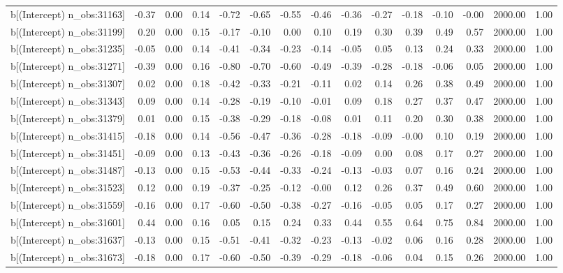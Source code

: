 \begin{table}[ht]
\begin{tabular}{rrrrrrrrrrrrrrr}
  b[(Intercept) n\_obs:31163] & -0.37 & 0.00 & 0.14 & -0.72 & -0.65 & -0.55 & -0.46 & -0.36 & -0.27 & -0.18 & -0.10 & -0.00 & 2000.00 & 1.00 \\ 
  b[(Intercept) n\_obs:31199] & 0.20 & 0.00 & 0.15 & -0.17 & -0.10 & 0.00 & 0.10 & 0.19 & 0.30 & 0.39 & 0.49 & 0.57 & 2000.00 & 1.00 \\ 
  b[(Intercept) n\_obs:31235] & -0.05 & 0.00 & 0.14 & -0.41 & -0.34 & -0.23 & -0.14 & -0.05 & 0.05 & 0.13 & 0.24 & 0.33 & 2000.00 & 1.00 \\ 
  b[(Intercept) n\_obs:31271] & -0.39 & 0.00 & 0.16 & -0.80 & -0.70 & -0.60 & -0.49 & -0.39 & -0.28 & -0.18 & -0.06 & 0.05 & 2000.00 & 1.00 \\ 
  b[(Intercept) n\_obs:31307] & 0.02 & 0.00 & 0.18 & -0.42 & -0.33 & -0.21 & -0.11 & 0.02 & 0.14 & 0.26 & 0.38 & 0.49 & 2000.00 & 1.00 \\ 
  b[(Intercept) n\_obs:31343] & 0.09 & 0.00 & 0.14 & -0.28 & -0.19 & -0.10 & -0.01 & 0.09 & 0.18 & 0.27 & 0.37 & 0.47 & 2000.00 & 1.00 \\ 
  b[(Intercept) n\_obs:31379] & 0.01 & 0.00 & 0.15 & -0.38 & -0.29 & -0.18 & -0.08 & 0.01 & 0.11 & 0.20 & 0.30 & 0.38 & 2000.00 & 1.00 \\ 
  b[(Intercept) n\_obs:31415] & -0.18 & 0.00 & 0.14 & -0.56 & -0.47 & -0.36 & -0.28 & -0.18 & -0.09 & -0.00 & 0.10 & 0.19 & 2000.00 & 1.00 \\ 
  b[(Intercept) n\_obs:31451] & -0.09 & 0.00 & 0.13 & -0.43 & -0.36 & -0.26 & -0.18 & -0.09 & 0.00 & 0.08 & 0.17 & 0.27 & 2000.00 & 1.00 \\ 
  b[(Intercept) n\_obs:31487] & -0.13 & 0.00 & 0.15 & -0.53 & -0.44 & -0.33 & -0.24 & -0.13 & -0.03 & 0.07 & 0.16 & 0.24 & 2000.00 & 1.00 \\ 
  b[(Intercept) n\_obs:31523] & 0.12 & 0.00 & 0.19 & -0.37 & -0.25 & -0.12 & -0.00 & 0.12 & 0.26 & 0.37 & 0.49 & 0.60 & 2000.00 & 1.00 \\ 
  b[(Intercept) n\_obs:31559] & -0.16 & 0.00 & 0.17 & -0.60 & -0.50 & -0.38 & -0.27 & -0.16 & -0.05 & 0.05 & 0.17 & 0.27 & 2000.00 & 1.00 \\ 
  b[(Intercept) n\_obs:31601] & 0.44 & 0.00 & 0.16 & 0.05 & 0.15 & 0.24 & 0.33 & 0.44 & 0.55 & 0.64 & 0.75 & 0.84 & 2000.00 & 1.00 \\ 
  b[(Intercept) n\_obs:31637] & -0.13 & 0.00 & 0.15 & -0.51 & -0.41 & -0.32 & -0.23 & -0.13 & -0.02 & 0.06 & 0.16 & 0.28 & 2000.00 & 1.00 \\ 
  b[(Intercept) n\_obs:31673] & -0.18 & 0.00 & 0.17 & -0.60 & -0.50 & -0.39 & -0.29 & -0.18 & -0.06 & 0.04 & 0.15 & 0.26 & 2000.00 & 1.00 \\ 

\end{tabular}
\end{table}
